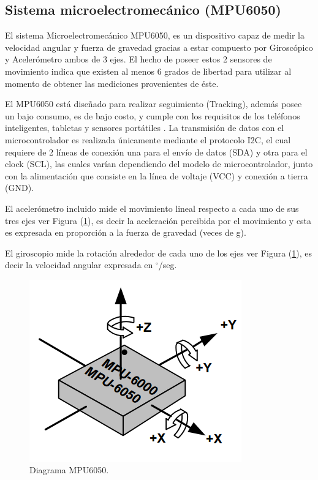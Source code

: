 \documentclass[12pt,a4paper]{article}
\newcommand{\grad}{$^{\circ}$}
\begin{document}
\newpage
\subsection{Sistema microelectromecánico (MPU6050)}
El sistema Microelectromecánico MPU6050\cite{MPU6050}, es un dispositivo capaz de medir la velocidad angular y fuerza de gravedad gracias a estar compuesto por Giroscópico y Acelerómetro ambos de 3 ejes. El hecho de poseer estos 2 sensores de movimiento indica que existen al menos 6 grados de libertad para utilizar al momento de obtener las mediciones provenientes de éste.

El MPU6050 está diseñado para realizar seguimiento (Tracking), además posee un bajo consumo, es de bajo costo, y cumple con los requisitos de los teléfonos inteligentes, tabletas y sensores portátiles \cite{MPU6050}.
La transmisión de datos con el microcontrolador es realizada únicamente mediante el protocolo I2C, el cual requiere de 2 líneas de conexión una para el envío de datos (SDA) y otra para el clock (SCL), las cuales varían dependiendo del modelo de microcontrolador, junto con la alimentación que consiste en la línea de voltaje (VCC) y conexión a tierra (GND).

El acelerómetro incluido mide el movimiento lineal respecto a cada uno de sus tres ejes ver Figura (\ref{fig:MPU6050}), es decir la aceleración percibida por el movimiento y esta es expresada en proporción a la fuerza de gravedad (veces de g).

El giroscopio mide la rotación alrededor de cada uno de los ejes ver Figura (\ref{fig:MPU6050}), es decir la velocidad angular expresada en \grad/seg.

\begin{figure}[H]
	\centering
	\includegraphics[scale=0.5]{images/MPU6050}
	\caption{Diagrama MPU6050.}
	\label{fig:MPU6050}
\end{figure}
\end{document}
